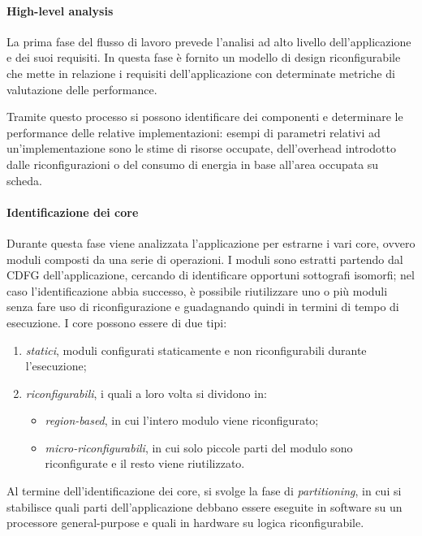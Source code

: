 \paragraph{High-level analysis}
La prima fase del flusso di lavoro prevede l'analisi ad alto livello 
dell'applicazione e dei suoi requisiti. In questa fase è fornito un modello di 
design riconfigurabile che mette in relazione i requisiti dell'applicazione con 
determinate metriche di valutazione delle performance.

Tramite questo processo si possono identificare dei componenti e determinare le 
performance delle relative implementazioni: esempi di parametri relativi ad 
un'implementazione sono le stime di risorse occupate, dell'overhead introdotto 
dalle riconfigurazioni o del consumo di energia in base all'area occupata su 
scheda.

\paragraph{Identificazione dei core}
Durante questa fase viene analizzata l'applicazione per estrarne i vari core, 
ovvero moduli composti da una serie di operazioni. I moduli sono estratti 
partendo dal \ac{CDFG} dell'applicazione, cercando di identificare opportuni 
sottografi isomorfi; nel caso l'identificazione abbia successo, è possibile 
riutilizzare uno o più moduli senza fare uso di riconfigurazione e guadagnando 
quindi in termini di tempo di esecuzione.
I core possono essere di due tipi:
\begin{enumerate}
 \item \emph{statici}, moduli configurati staticamente e non riconfigurabili 
durante l'esecuzione;
 \item \emph{riconfigurabili}, i quali a loro volta si dividono in:
  \begin{itemize}
   \item \emph{region-based}, in cui l'intero modulo viene riconfigurato;
   \item \emph{micro-riconfigurabili}, in cui solo piccole parti del modulo 
sono riconfigurate e il resto viene riutilizzato.
  \end{itemize}
\end{enumerate}

Al termine dell'identificazione dei core, si svolge la fase di 
\emph{partitioning}, in cui si stabilisce quali parti dell'applicazione debbano 
essere eseguite in software su un processore general-purpose e quali in 
hardware su logica riconfigurabile.

